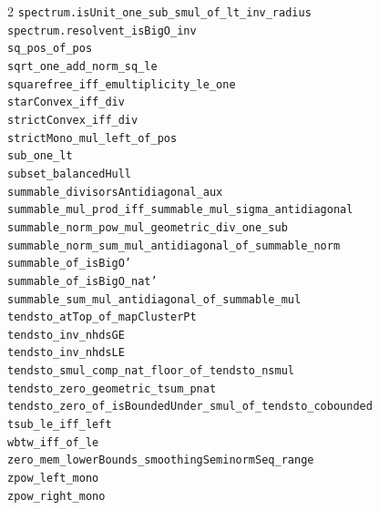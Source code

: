 \documentclass[10pt,a4paper]{article}
\begin{document}
\begin{multicols}{2}
\texttt{spectrum.\allowbreak{}isUnit\_one\_sub\_smul\_of\_lt\_inv\_radius} \\
\texttt{spectrum.\allowbreak{}resolvent\_isBigO\_inv} \\
\texttt{sq\_pos\_of\_pos} \\
\texttt{sqrt\_one\_add\_norm\_sq\_le} \\
\texttt{squarefree\_iff\_emultiplicity\_le\_one} \\
\texttt{starConvex\_iff\_div} \\
\texttt{strictConvex\_iff\_div} \\
\texttt{strictMono\_mul\_left\_of\_pos} \\
\texttt{sub\_one\_lt} \\
\texttt{subset\_balancedHull} \\
\texttt{summable\_divisorsAntidiagonal\_aux} \\
\texttt{summable\_mul\_prod\_iff\_summable\_mul\_sigma\_antidiagonal} \\
\texttt{summable\_norm\_pow\_mul\_geometric\_div\_one\_sub} \\
\texttt{summable\_norm\_sum\_mul\_antidiagonal\_of\_summable\_norm} \\
\texttt{summable\_of\_isBigO'} \\
\texttt{summable\_of\_isBigO\_nat'} \\
\texttt{summable\_sum\_mul\_antidiagonal\_of\_summable\_mul} \\
\texttt{tendsto\_atTop\_of\_mapClusterPt} \\
\texttt{tendsto\_inv\_nhdsGE} \\
\texttt{tendsto\_inv\_nhdsLE} \\
\texttt{tendsto\_smul\_comp\_nat\_floor\_of\_tendsto\_nsmul} \\
\texttt{tendsto\_zero\_geometric\_tsum\_pnat} \\
\texttt{tendsto\_zero\_of\_isBoundedUnder\_smul\_of\_tendsto\_cobounded} \\
\texttt{tsub\_le\_iff\_left} \\
\texttt{wbtw\_iff\_of\_le} \\
\texttt{zero\_mem\_lowerBounds\_smoothingSeminormSeq\_range} \\
\texttt{zpow\_left\_mono} \\
\texttt{zpow\_right\_mono} \\
\end{multicols}
\end{document}
